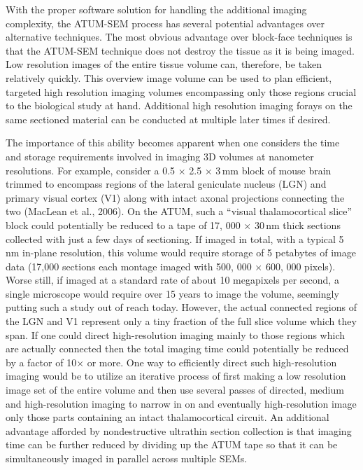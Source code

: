 \documentclass{article}
\begin{document}
With the proper software solution for handling the additional imaging complexity, the ATUM-SEM process has several potential advantages over alternative techniques. The most obvious advantage over block-face techniques is that the ATUM-SEM technique does not destroy the tissue as it is being imaged. Low resolution images of the entire tissue volume can, therefore, be taken relatively quickly. This overview image volume can be used to plan efficient, targeted high resolution imaging volumes encompassing only those regions crucial to the biological study at hand. Additional high resolution imaging forays on the same sectioned material can be conducted at multiple later times if desired.

The importance of this ability becomes apparent when one considers the time and storage requirements involved in imaging 3D volumes at nanometer resolutions. For example, consider a 0.5 × 2.5 × 3\,mm block of mouse brain trimmed to encompass regions of the lateral geniculate nucleus (LGN) and primary visual cortex (V1) along with intact axonal projections connecting the two (MacLean et al., 2006). On the ATUM, such a “visual thalamocortical slice” block could potentially be reduced to a tape of 17, 000 × 30\,nm thick sections collected with just a few days of sectioning. If imaged in total, with a typical 5\,nm in-plane resolution, this volume would require storage of 5 petabytes of image data (17,000 sections each montage imaged with 500, 000 × 600, 000 pixels). Worse still, if imaged at a standard rate of about 10 megapixels per second, a single microscope would require over 15 years to image the volume, seemingly putting such a study out of reach today. However, the actual connected regions of the LGN and V1 represent only a tiny fraction of the full slice volume which they span. If one could direct high-resolution imaging mainly to those regions which are actually connected then the total imaging time could potentially be reduced by a factor of 10× or more. One way to efficiently direct such high-resolution imaging would be to utilize an iterative process of first making a low resolution image set of the entire volume and then use several passes of directed, medium and high-resolution imaging to narrow in on and eventually high-resolution image only those parts containing an intact thalamocortical circuit. An additional advantage afforded by nondestructive ultrathin section collection is that imaging time can be further reduced by dividing up the ATUM tape so that it can be simultaneously imaged in parallel across multiple SEMs.
\end{document}

